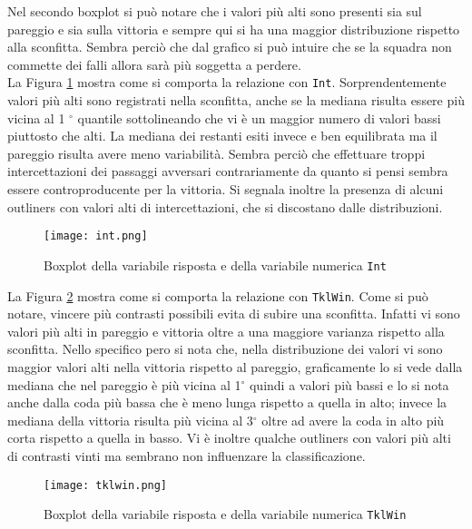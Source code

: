 Nel secondo boxplot si può notare che i valori più alti sono presenti sia sul pareggio e sia sulla vittoria e sempre qui si ha una maggior distribuzione rispetto alla sconfitta. Sembra perciò che dal grafico si può intuire che se la squadra non commette dei falli allora sarà più soggetta a perdere.\\

La Figura \ref{fig:int} mostra come si comporta la relazione con \texttt{Int}. Sorprendentemente valori più alti sono registrati nella sconfitta, anche se la mediana risulta essere più vicina al 1 $^{\circ}$ quantile sottolineando che vi è un maggior numero di valori bassi piuttosto che alti. La mediana dei restanti esiti invece e ben equilibrata ma il pareggio risulta avere meno variabilità. Sembra perciò che effettuare troppi intercettazioni dei passaggi avversari contrariamente da quanto si pensi sembra essere controproducente per la vittoria. Si segnala inoltre la presenza di alcuni outliners con valori alti di intercettazioni, che si discostano dalle distribuzioni.\\

\begin{figure}[htbp]
	\begin{center}
		\texttt{[image: int.png]}
		\caption{Boxplot della variabile risposta e della variabile numerica \texttt{Int}} \label{fig:int}
	\end{center}
\end{figure}

La Figura \ref{fig:tkl} mostra come si comporta la relazione con \texttt{TklWin}. Come si può notare, vincere più contrasti possibili evita di subire una sconfitta. Infatti vi sono valori più alti in pareggio e vittoria oltre a una maggiore varianza rispetto alla sconfitta. Nello specifico pero si nota che, nella distribuzione dei valori vi sono maggior valori alti nella vittoria rispetto al pareggio, graficamente lo si vede dalla mediana che nel pareggio è più vicina al 1$^{\circ}$ quindi a valori più bassi e lo si nota anche dalla coda più bassa che è meno lunga rispetto a quella in alto; invece la mediana della vittoria risulta più vicina al 3$^{\circ}$ oltre ad avere la coda in alto più corta rispetto a quella in basso. Vi è inoltre qualche outliners con valori più alti di contrasti vinti ma sembrano non influenzare la classificazione.\\

\begin{figure}[htbp]
	\begin{center}
		\texttt{[image: tklwin.png]}
		\caption{Boxplot della variabile risposta e della variabile numerica \texttt{TklWin}} \label{fig:tkl}
	\end{center}
\end{figure}


